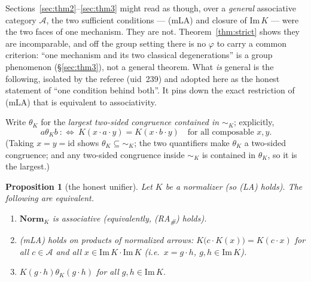 \documentclass[11pt]{amsart}
\theoremstyle{plain}
\newtheorem{proposition}[theorem]{Proposition}
\theoremstyle{definition}
\theoremstyle{remark}
\newcommand{\Norm}{\mathbf{Norm}}
\newcommand{\Img}{\mathrm{Im}\,}
\newcommand{\id}{\mathrm{id}}
\newcommand{\LA}{\textsf{(LA)}}
\newcommand{\mLA}{\textsf{(mLA)}}
\newcommand{\RA}{\textsf{(RA}\textsubscript{\#}\textsf{)}}
\newcommand{\simK}{\mathrel{\sim_{K}}}
\begin{document}
Sections~\ref{sec:thm2}--\ref{sec:thm3} might read as though, over a \emph{general} associative
category $\mathcal{A}$, the two sufficient conditions --- \mLA{} and closure of $\Img K$ --- were the
two faces of one mechanism. They are not. Theorem~\ref{thm:strict} shows they are incomparable, and
off the group setting there is no $\varphi$ to carry a common criterion: ``one mechanism and its two
classical degenerations'' is a group phenomenon (§\ref{sec:thm3}), not a general theorem. What
\emph{is} general is the following, isolated by the referee (uid~239) and adopted here as the honest
statement of ``one condition behind both''. It pins down the exact restriction of \mLA{} that is
equivalent to associativity.

Write $\theta_K$ for the \emph{largest two-sided congruence contained in $\simK$}; explicitly,
\[
  a\mathbin{\theta_K}b\ :\Longleftrightarrow\ K(x\cdot a\cdot y)=K(x\cdot b\cdot y)
  \quad\text{for all composable }x,y.
\]
(Taking $x=y=\id$ shows $\theta_K\subseteq\simK$; the two quantifiers make $\theta_K$ a two-sided
congruence; and any two-sided congruence inside $\simK$ is contained in $\theta_K$, so it is the
largest.)

\begin{proposition}[the honest unifier]
\label{prop:tfae}
Let $K$ be a normalizer (so \LA{} holds). The following are equivalent.
\begin{enumerate}
  \item $\Norm_K$ is associative (equivalently, \RA{} holds).
  \item \mLA{} holds \emph{on products of normalized arrows:} $K\big(c\cdot K(x)\big)=K(c\cdot x)$ for
        all $c\in\mathcal{A}$ and all $x\in\Img K\cdot\Img K$ (i.e.\ $x=g\cdot h$, $g,h\in\Img K$).
  \item $K(g\cdot h)\mathbin{\theta_K}(g\cdot h)$ for all $g,h\in\Img K$.
\end{enumerate}
\end{proposition}
\end{document}
